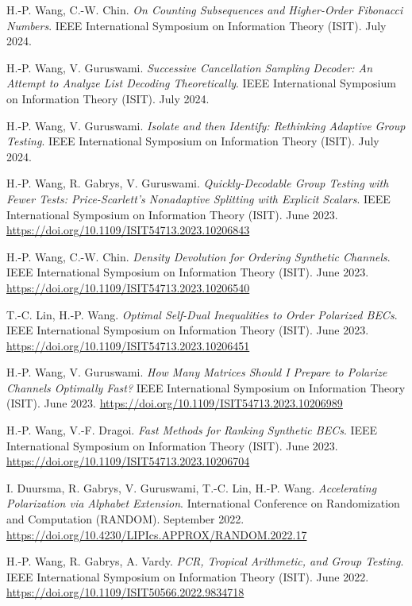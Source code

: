 \documentclass{article}
\def\sec#1{\vskip1em\textbf{\fs1#1}}
\def\fs#1{%
        \pgfmathsetmacro\a{#1}%
        \pgfmathsetmacro\A{\parskip*(4/3)^\a}%
        \pgfmathsetmacro\B{\A*(4/3)}%
        \fontsize{\A pt}{\B pt}\selectfont%
    }
\begin{document}
\bgroup
\def\section#1#2{\sec{Peer-Reviewed Conference Publications \mdseries (new to old)}}
\begin{thebibliography}{C99}

     H.-P. Wang, C.-W. Chin.
    \emph{On Counting Subsequences and Higher-Order Fibonacci Numbers}.
    IEEE International Symposium on Information Theory (ISIT).
    July 2024.
 
     H.-P. Wang, V. Guruswami.
    \emph{Successive Cancellation Sampling Decoder: An Attempt to Analyze List Decoding Theoretically}.
    IEEE International Symposium on Information Theory (ISIT).
    July 2024.
 
     H.-P. Wang, V. Guruswami.
    \emph{Isolate and then Identify: Rethinking Adaptive Group Testing}.
    IEEE International Symposium on Information Theory (ISIT).
    July 2024.

    H.-P. Wang, R. Gabrys, V. Guruswami.
    \emph{Quickly-Decodable Group Testing with Fewer Tests:
    Price-Scarlett's Nonadaptive Splitting with Explicit Scalars}.
    IEEE International Symposium on Information Theory (ISIT).
    June 2023.
    \url{https://doi.org/10.1109/ISIT54713.2023.10206843}

    H.-P. Wang, C.-W. Chin.
    \emph{Density Devolution for Ordering Synthetic Channels}.
    IEEE International Symposium on Information Theory (ISIT).
    June 2023.
    \url{https://doi.org/10.1109/ISIT54713.2023.10206540}

    T.-C. Lin, H.-P. Wang.
    \emph{Optimal Self-Dual Inequalities to Order Polarized BECs}.
    IEEE International Symposium on Information Theory (ISIT).
    June 2023.
    \url{https://doi.org/10.1109/ISIT54713.2023.10206451}

    H.-P. Wang, V. Guruswami.
    \emph{How Many Matrices Should I Prepare to Polarize Channels Optimally Fast?}
    IEEE International Symposium on Information Theory (ISIT).
    June 2023.
    \url{https://doi.org/10.1109/ISIT54713.2023.10206989}

    H.-P. Wang, V.-F. Dragoi.
    \emph{Fast Methods for Ranking Synthetic BECs}.
    IEEE International Symposium on Information Theory (ISIT).
    June 2023.
    \url{https://doi.org/10.1109/ISIT54713.2023.10206704}

    I. Duursma, R. Gabrys, V. Guruswami, T.-C. Lin, H.-P. Wang.
    \emph{Accelerating Polarization via Alphabet Extension}.
    International Conference on Randomization and Computation (RANDOM).
    September 2022.
    \url{https://doi.org/10.4230/LIPIcs.APPROX/RANDOM.2022.17}

    H.-P. Wang, R. Gabrys, A. Vardy.
    \emph{PCR, Tropical Arithmetic, and Group Testing}.
    IEEE International Symposium on Information Theory (ISIT).
    June 2022.
    \url{https://doi.org/10.1109/ISIT50566.2022.9834718}
\end{thebibliography}
\egroup
\end{document}
